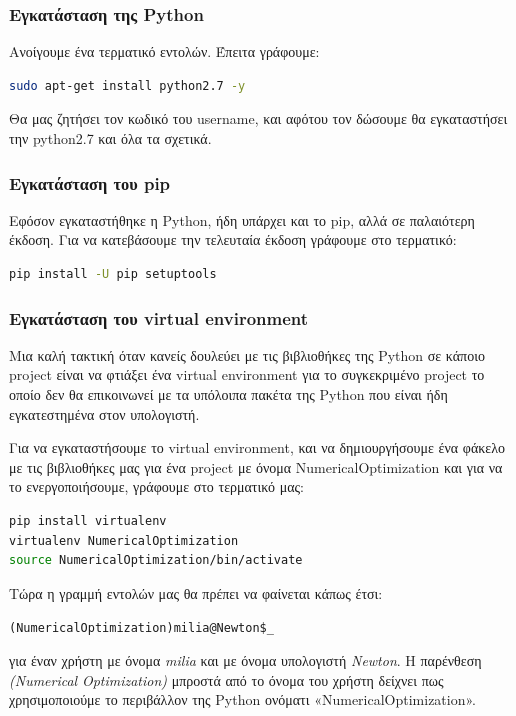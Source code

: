 \documentclass[a4paper,12pt,twoside]{report}
\theoremstyle{plain}
\theoremstyle{definition}
\theoremstyle{remark}
\begin{document}
\subsubsection{Εγκατάσταση της Python}

Ανοίγουμε ένα τερματικό εντολών. Έπειτα γράφουμε:
\begin{lstlisting}[extendedchars=true,language=bash]
	sudo apt-get install python2.7 -y
\end{lstlisting}

Θα μας ζητήσει τον κωδικό του username, και αφότου τον δώσουμε θα εγκαταστήσει την python2.7 και όλα τα σχετικά.

\subsubsection{Εγκατάσταση του pip}

Εφόσον εγκαταστήθηκε η Python, ήδη υπάρχει και το pip, αλλά σε παλαιότερη έκδοση. Για να κατεβάσουμε την τελευταία έκδοση γράφουμε στο τερματικό:
\begin{lstlisting}[extendedchars=true,language=bash]
pip install -U pip setuptools
\end{lstlisting}

\subsubsection{Εγκατάσταση του virtual environment}
Μια καλή τακτική όταν κανείς δουλεύει με τις βιβλιοθήκες της Python σε κάποιο project είναι να φτιάξει ένα virtual environment για το συγκεκριμένο project το οποίο δεν θα επικοινωνεί με τα υπόλοιπα πακέτα της Python που είναι ήδη εγκατεστημένα στον υπολογιστή.

Για να εγκαταστήσουμε το virtual environment, και να δημιουργήσουμε ένα φάκελο με τις βιβλιοθήκες μας για ένα project με όνομα NumericalOptimization και για να το ενεργοποιήσουμε, γράφουμε στο τερματικό μας:
\begin{lstlisting}[extendedchars=true,language=bash]
pip install virtualenv
virtualenv NumericalOptimization
source NumericalOptimization/bin/activate
\end{lstlisting}

Τώρα η γραμμή εντολών μας θα πρέπει να φαίνεται κάπως έτσι:
\begin{center}
	\texttt{(NumericalOptimization)milia@Newton\$\_}
\end{center}
για έναν χρήστη με όνομα \textit{milia} και με όνομα υπολογιστή \textit{Newton}. Η παρένθεση \textit{(Numerical} \textit{Optimization)} μπροστά από το όνομα του χρήστη δείχνει πως χρησιμοποιούμε το περιβάλλον της Python ονόματι «NumericalOptimization».
\end{document}
